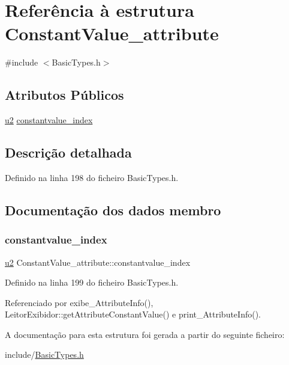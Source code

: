 \hypertarget{structConstantValue__attribute}{}\section{Referência à estrutura Constant\+Value\+\_\+attribute}
\label{structConstantValue__attribute}


{\ttfamily \#include $<$Basic\+Types.\+h$>$}

\subsection*{Atributos Públicos}
\begin{DoxyCompactItemize}
\item 
\hyperlink{BasicTypes_8h_a732cde1300aafb73b0ea6c2558a7a54f}{u2} \hyperlink{structConstantValue__attribute_a812157e7121906faf8018ce066d1ea27}{constantvalue\+\_\+index}
\end{DoxyCompactItemize}


\subsection{Descrição detalhada}


Definido na linha 198 do ficheiro Basic\+Types.\+h.



\subsection{Documentação dos dados membro}
\mbox{\label{structConstantValue__attribute_a812157e7121906faf8018ce066d1ea27}} 
\subsubsection{\texorpdfstring{constantvalue\+\_\+index}{constantvalue\_index}}
{\footnotesize\ttfamily \hyperlink{BasicTypes_8h_a732cde1300aafb73b0ea6c2558a7a54f}{u2} Constant\+Value\+\_\+attribute\+::constantvalue\+\_\+index}



Definido na linha 199 do ficheiro Basic\+Types.\+h.



Referenciado por exibe\+\_\+\+Attribute\+Info(), Leitor\+Exibidor\+::get\+Attribute\+Constant\+Value() e print\+\_\+\+Attribute\+Info().



A documentação para esta estrutura foi gerada a partir do seguinte ficheiro\+:\begin{DoxyCompactItemize}
\item 
include/\hyperlink{BasicTypes_8h}{Basic\+Types.\+h}\end{DoxyCompactItemize}
